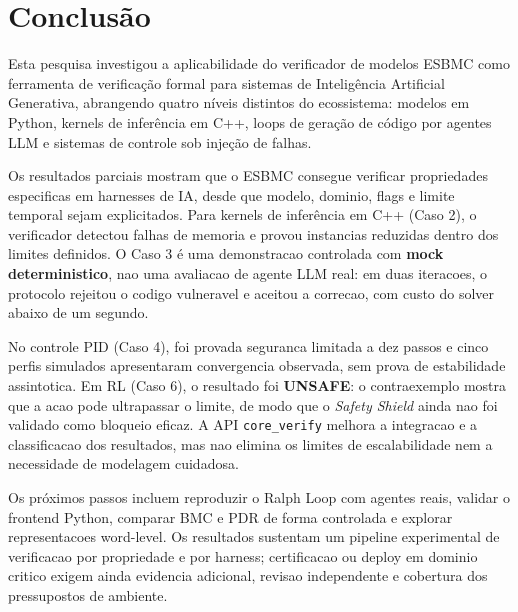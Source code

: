 \chapter{Conclusão}
\label{cap:conclusao}

Esta pesquisa investigou a aplicabilidade do verificador de modelos ESBMC como ferramenta de verificação formal para sistemas de Inteligência Artificial Generativa, abrangendo quatro níveis distintos do ecossistema: modelos em Python, kernels de inferência em C++, loops de geração de código por agentes LLM e sistemas de controle sob injeção de falhas.

Os resultados parciais mostram que o ESBMC consegue verificar propriedades
especificas em harnesses de IA, desde que modelo, dominio, flags e limite temporal
sejam explicitados. Para kernels de inferência em C++ (Caso 2), o verificador
detectou falhas de memoria e provou instancias reduzidas dentro dos limites
definidos. O Caso 3 é uma demonstracao controlada com \textbf{mock deterministico},
nao uma avaliacao de agente LLM real: em duas iteracoes, o protocolo rejeitou o
codigo vulneravel e aceitou a correcao, com custo do solver abaixo de um segundo.

No controle PID (Caso 4), foi provada seguranca limitada a dez passos e cinco
perfis simulados apresentaram convergencia observada, sem prova de estabilidade
assintotica. Em RL (Caso 6), o resultado foi \textbf{UNSAFE}: o contraexemplo mostra
que a acao pode ultrapassar o limite, de modo que o \textit{Safety Shield} ainda
nao foi validado como bloqueio eficaz. A API \texttt{core\_verify} melhora a
integracao e a classificacao dos resultados, mas nao elimina os limites de
escalabilidade nem a necessidade de modelagem cuidadosa.

Os próximos passos incluem reproduzir o Ralph Loop com agentes reais, validar o
frontend Python, comparar BMC e PDR de forma controlada e explorar representacoes
word-level. Os resultados sustentam um pipeline experimental de verificacao por
propriedade e por harness; certificacao ou deploy em dominio critico exigem ainda
evidencia adicional, revisao independente e cobertura dos pressupostos de ambiente.
